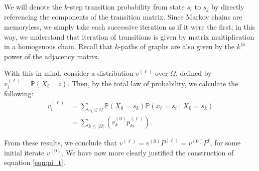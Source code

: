 \documentclass[12pt]{article}
\newcommand{\iterate}[2]{#1^{(#2)}}
\newcommand{\parens}[1]{ \left( #1 \right) }
\newcommand{\prob}{\mathbb{P}}
\begin{document}
We will denote the $k$-step transition probability from state $s_i$ to $s_j$ by
directly referencing the components of the transition matrix. Since Markov
chains are memoryless, we simply take each successive iteration as if it were
the first; in this way, we understand that iteration of transitions is given by
matrix multiplication in a homogenous chain. Recall that $k$-paths of graphs are
also given by the $k^\text{th}$ power of the adjacency matrix.

With this in mind, consider a distribution $\iterate{v}{\ell}$ over $\Omega$,
defined by $\iterate{v}{\ell}_i = \prob(X_\ell = i)$. Then, by the total law of
probability, we calculate the following:
\begin{align*}
  \iterate{v}{\ell}_i &= \sum_{s_k\in\Omega}{\prob(X_0 = s_k) \prob(x_\ell = s_i \mid X_0 = s_k)} \\
                      &= \sum_{k\leq |\Omega|}{\parens{\iterate{v}{0}_k \iterate{p}{\ell}_{ki}}}.
\end{align*}

From these results, we conclude that
$\iterate{v}{\ell} = \iterate{v}{0} \iterate{P}{\ell} = \iterate{v}{0} P^\ell$,
for some initial iterate $\iterate{v}{0}$. We have now more clearly justified
the construction of equation \eqref{eqn:pi_t}.
\end{document}
